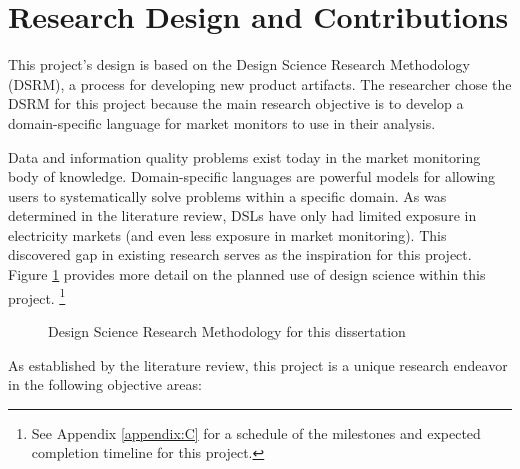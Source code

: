 \section{Research Design and Contributions}

This project's design is based on the Design Science Research Methodology (DSRM), a process for developing new product artifacts. The researcher chose the DSRM for this project because the main research objective is to develop a domain-specific language for market monitors to use in their analysis.

Data and information quality problems exist today in the market monitoring body of knowledge. Domain-specific languages are powerful models for allowing users to systematically solve problems within a specific domain. As was determined in the literature review, DSLs have only had limited exposure in electricity markets (and even less exposure in market monitoring). This discovered gap in existing research serves as the inspiration for this project. Figure \ref{fig:dsrm-diagram} provides more detail on the planned use of design science within this project. \footnote{See Appendix \ref{appendix:C} for a schedule of the milestones and expected completion timeline for this project.}

\begin{figure}[ht]
\centering
{}
\caption{Design Science Research Methodology for this dissertation}
\label{fig:dsrm-diagram}
\end{figure}

As established by the literature review, this project is a unique research endeavor in the following objective areas:

